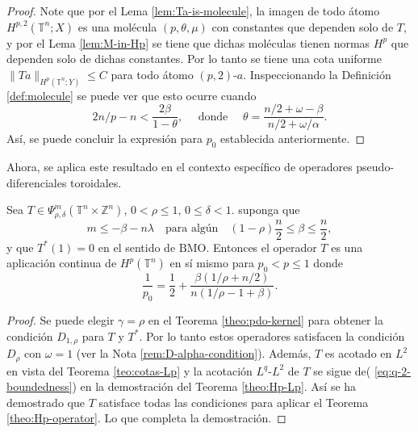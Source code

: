 \begin{proof}
	Note que por el Lema \ref{lem:Ta-is-molecule}, la imagen de todo átomo $H^{p,2}(\mathbb{T}^n;X)$ es una molécula $(p, \theta,\mu)$ con constantes que dependen solo de $T$, y por el Lema \ref{lem:M-in-Hp} se tiene que dichas moléculas tienen normas $H^p$ que dependen solo de dichas constantes. Por lo tanto se tiene una cota uniforme $\|Ta\|_{H^p(\mathbb{T}^n;Y)}\leq C$ para todo átomo $(p,2)$-$a$. Inspeccionando la Definición \ref{def:molecule} se puede ver que esto ocurre cuando 
	\begin{equation*}
		2n/p -n < \frac{2\beta}{1-\theta}, \quad \text{ donde } \quad \theta = \frac{n/2+\omega-\beta}{n/2+\omega/\alpha}.
	\end{equation*}
	Así, se puede concluir la expresión para $p_0$ establecida anteriormente.
\end{proof}
Ahora, se aplica este resultado en el contexto específico de operadores pseudo-diferenciales toroidales.
\begin{theorem}
	Sea $T\in \Psi^m_{\rho,\delta}(\mathbb{T}^n\times\mathbb{Z}^n)$, $0<\rho\leq1$, $0\leq\delta<1$. suponga que
	\begin{equation}
		m\leq-\beta-n\lambda \quad  \text{para algún} \quad (1-\rho)\frac{n}{2}\leq\beta\leq \frac{n}{2}, 
	\end{equation}
	y que $T^*(1)=0$ en el sentido de $\mathrm{BMO}$. Entonces el operador $T$ es una aplicación continua de $H^p(\mathbb{T}^n)$ en sí mismo para $p_0<p\leq1$ donde 
	\begin{equation}
		\frac{1}{p_0} = \frac{1}{2}+\frac{\beta(1/\rho + n/2)}{n(1/\rho-1+\beta)}.
	\end{equation}
\end{theorem}
\begin{proof}
	Se puede elegir $\gamma =\rho$ en el Teorema \ref{theo:pdo-kernel} para obtener la condición $D_{1,\rho}$ para $T$ y $T^*$. Por lo tanto estos operadores satisfacen la condición $D_\rho$  con $\omega=1$ (ver la Nota \ref{rem:D-alpha-condition}). Además, $T$ es acotado en $L^2$ en vista del Teorema \ref{teo:cotas-Lp} y la acotación $L^q$-$L^2$ de $T$ se sigue de( \ref{eq:q-2-boundedness}) en la demostración del Teorema \ref{theo:Hp-Lp}. Así se ha demostrado que $T$ satisface todas las condiciones para aplicar el Teorema \ref{theo:Hp-operator}. Lo que completa la demostración.
\end{proof}

